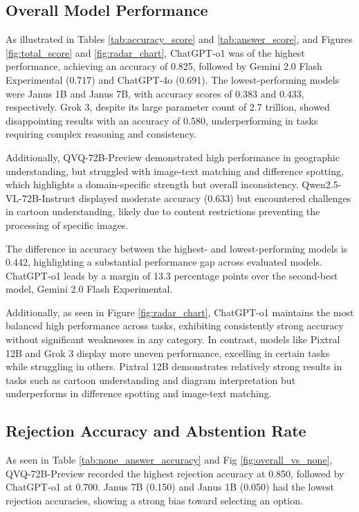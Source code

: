 \subsection{Overall Model Performance} As illustrated in Tables \ref{tab:accuracy_score} and \ref{tab:answer_score}, and Figures \ref{fig:total_score} and \ref{fig:radar_chart}, ChatGPT-o1 was of the highest performance, achieving an accuracy of 0.825, followed by Gemini 2.0 Flash Experimental (0.717) and ChatGPT-4o (0.691). The lowest-performing models were Janus 1B and Janus 7B, with accuracy scores of 0.383 and 0.433, respectively. Grok 3, despite its large parameter count of 2.7 trillion, showed disappointing results with an accuracy of 0.580, underperforming in tasks requiring complex reasoning and consistency.

Additionally, QVQ-72B-Preview demonstrated high performance in geographic understanding, but struggled with image-text matching and difference spotting, which highlights a domain-specific strength but overall inconsistency. Qwen2.5-VL-72B-Instruct displayed moderate accuracy (0.633) but encountered challenges in cartoon understanding, likely due to content restrictions preventing the processing of specific images.

The difference in accuracy between the highest- and lowest-performing models is 0.442, highlighting a substantial performance gap across evaluated models. ChatGPT-o1 leads by a margin of 13.3 percentage points over the second-best model, Gemini 2.0 Flash Experimental.

Additionally, as seen in Figure \ref{fig:radar_chart}, ChatGPT-o1 maintains the most balanced high performance across tasks, exhibiting consistently strong accuracy without significant weaknesses in any category. In contrast, models like Pixtral 12B and Grok 3 display more uneven performance, excelling in certain tasks while struggling in others. Pixtral 12B demonstrates relatively strong results in tasks such as cartoon understanding and diagram interpretation but underperforms in difference spotting and image-text matching.

\subsection{Rejection Accuracy and Abstention Rate}

As seen in Table \ref{tab:none_answer_accuracy} and Fig \ref{fig:overall_vs_none}, QVQ-72B-Preview recorded the highest rejection accuracy at 0.850, followed by ChatGPT-o1 at 0.700. Janus 7B (0.150) and Janus 1B (0.050) had the lowest rejection accuracies, showing a strong bias toward selecting an option.

